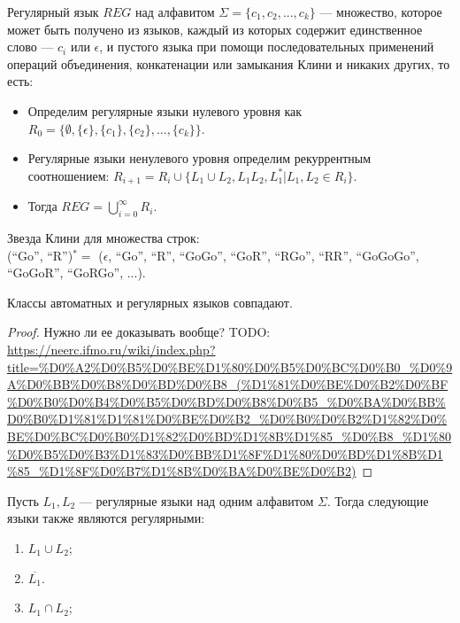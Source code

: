     \begin{Def}
        Регулярный язык $REG$ над алфавитом $\Sigma = \{c_1, c_2, ...,c_k\}$ — множество, которое может быть получено из языков, каждый из которых содержит единственное слово --- $c_i$ или $\epsilon$, и пустого языка при помощи последовательных применений операций объединения, конкатенации или замыкания Клини и никаких других, то есть:
        \begin{itemize}
            \item Определим регулярные языки нулевого уровня как $R_0 = \{\emptyset, \{\epsilon\}, \{c_1\}, \{c_2\}, ...,\{c_k\}\}$.
            \item Регулярные языки ненулевого уровня определим рекуррентным соотношением: $R_{i + 1} = R_i \cup \{L_1 \cup L_2, L_1L_2, L^*_1 | L_1, L_2 \in R_i\}$.
            \item Тогда $REG = \bigcup_{i = 0}^{\infty} R_i$.
        \end{itemize}   
    \end{Def}
    \begin{Example}
        Звезда Клини для множества строк:\\ (``Go'', ``R'')$^* = $
        ($\epsilon$, ``Go'', ``R'', ``GoGo'', ``GoR'', ``RGo'', ``RR'', ``GoGoGo'', ``GoGoR'', ``GoRGo'', ...).
    \end{Example}
    \begin{Thm}
        Классы автоматных и регулярных языков совпадают.
    \end{Thm}
    \begin{proof}
        Нужно ли ее доказывать вообще? TODO: \url{https://neerc.ifmo.ru/wiki/index.php?title=%D0%A2%D0%B5%D0%BE%D1%80%D0%B5%D0%BC%D0%B0_%D0%9A%D0%BB%D0%B8%D0%BD%D0%B8_(%D1%81%D0%BE%D0%B2%D0%BF%D0%B0%D0%B4%D0%B5%D0%BD%D0%B8%D0%B5_%D0%BA%D0%BB%D0%B0%D1%81%D1%81%D0%BE%D0%B2_%D0%B0%D0%B2%D1%82%D0%BE%D0%BC%D0%B0%D1%82%D0%BD%D1%8B%D1%85_%D0%B8_%D1%80%D0%B5%D0%B3%D1%83%D0%BB%D1%8F%D1%80%D0%BD%D1%8B%D1%85_%D1%8F%D0%B7%D1%8B%D0%BA%D0%BE%D0%B2)}
    \end{proof}
    \begin{Thm}
        Пусть $L_1, L_2$ --- регулярные языки над одним алфавитом $\Sigma$. Тогда следующие языки также являются регулярными:
        \begin{enumerate}
            \item $L_1 \cup L_2$;
            \item $\overline{L_1}$.
            \item $L_1 \cap L_2$;
        \end{enumerate}
    \end{Thm}
